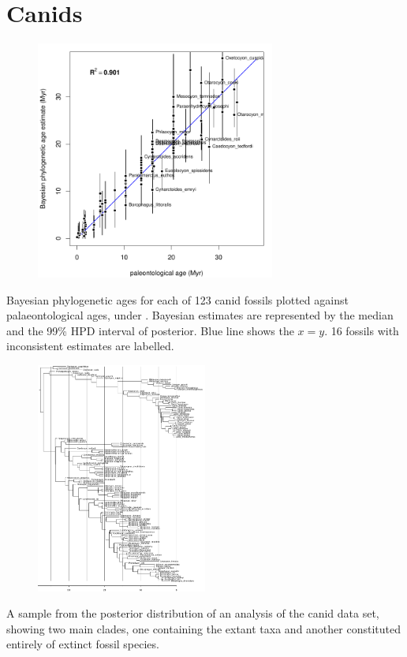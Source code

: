 \section{Canids}

\begin{frame}
\begin{figure}
\includegraphics[width=0.70\textwidth]{../canids/1c_phyloAgeVsGeoAge.pdf}
\end{figure}
{\small Bayesian phylogenetic ages for each of 123 canid fossils plotted against palaeontological ages, under \Mstrict{}. 
Bayesian estimates are represented by the median and the 99\% HPD interval of posterior. Blue line shows the $x=y$. 
16 fossils with inconsistent estimates are labelled.}
\end{frame}


\begin{frame}
\begin{figure}
\includegraphics[width=0.5\textwidth]{../canids/1_canids-1440516016976-tree5001.pdf}
\end{figure}
A sample from the posterior distribution of an analysis of the canid data set, showing two main clades, one containing the extant taxa and another constituted entirely of extinct fossil species.
\end{frame}
